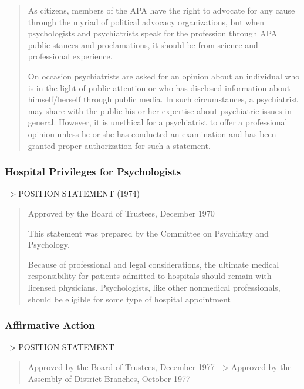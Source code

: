 \begin{refsection}
\begin{quote}

As citizens, members of the APA have the right to advocate for any cause through the myriad of political advocacy organizations, but when psychologists and psychiatrists speak for the profession through APA public stances and proclamations, it should be from science and professional experience. 

On occasion psychiatrists are asked for an opinion about an individual who is in the light of public attention or who has disclosed information about himself\slash herself through public media. In such circumstances, a psychiatrist may share with the public his or her expertise about psychiatric issues in general. However, it is unethical for a psychiatrist to offer a professional opinion unless he or she has conducted an examination and has been granted proper authorization for such a statement.
\end{quote}

\subsubsection{Hospital Privileges for Psychologists}
\label{hospitalprivilegesforpsychologists}

 $>$POSITION STATEMENT (1974)

\begin{quote}

Approved by the Board of Trustees, December 1970

This statement was prepared by the Committee on Psychiatry and Psychology.

Because of professional and legal considerations, the ultimate medical responsibility for patients admitted to hospitals should remain with licensed physicians. Psychologists, like other nonmedical professionals, should be eligible for some type of hospital appointment
\end{quote}

\subsubsection{Affirmative Action}
\label{affirmativeaction}

 $>$POSITION STATEMENT

\begin{quote}

Approved by the Board of Trustees, December 1977
 $>$Approved by the Assembly of District Branches, October 1977


\end{quote}
\end{refsection}

